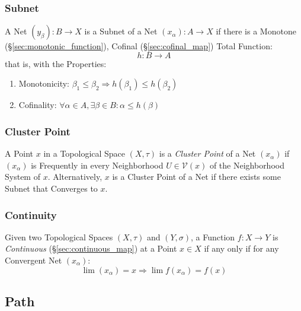 \subsubsection{Subnet}\label{sec:subnet}

A Net $(y_\beta) : B \rightarrow X$ is a Subnet of a Net $(x_\alpha) :
A \rightarrow X$ if there is a Monotone
(\S\ref{sec:monotonic_function}), Cofinal (\S\ref{sec:cofinal_map})
Total Function:
\[
  h : B \rightarrow A
\]
that is, with the Properties:
\begin{enumerate}
  \item Monotonicity:
  $\beta_1 \leq \beta_2 \Rightarrow h(\beta_1) \leq h(\beta_2)$
  \item Cofinality:
   $\forall \alpha \in A, \exists \beta \in B : \alpha \leq h(\beta)$
\end{enumerate}



\subsubsection{Cluster Point}\label{sec:cluster_point}

A Point $x$ in a Topological Space $(X,\tau)$ is a \emph{Cluster
  Point} of a Net $(x_\alpha)$ if $(x_\alpha)$ is Frequently in every
Neighborhood $U \in \mathcal{V}(x)$ of the Neighborhood System of $x$.
Alternatively, $x$ is a Cluster Point of a Net if there exists some
Subnet that Converges to $x$.



\subsubsection{Continuity}\label{sec:net_continuity}

Given two Topological Spaces $(X,\tau)$ and $(Y,\sigma)$, a Function
$f : X \rightarrow Y$ is \emph{Continuous}
(\S\ref{sec:continuous_map}) at a Point $x \in X$ if any only if for
any Convergent Net $(x_\alpha)$:
\[
  \lim (x_\alpha) = x \Rightarrow \lim f(x_\alpha) = f(x)
\]



\subsection{Path}\label{sec:path} \cite{hatcher02}

